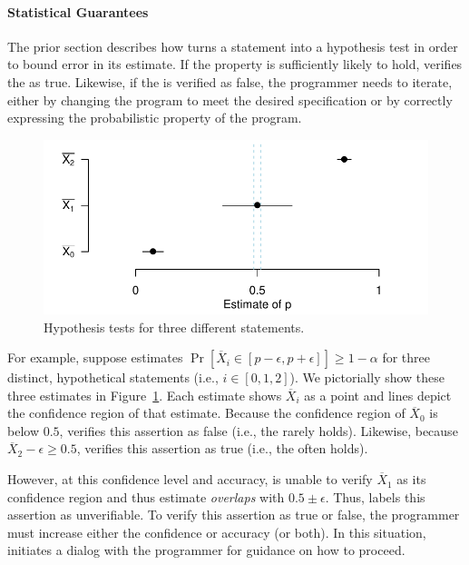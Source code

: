 \paragraph{Statistical Guarantees}

The prior section describes how \tool turns a \passert statement into
a hypothesis test in order to
bound error in its estimate. If the property is sufficiently likely
to hold, \tool verifies the \passert as true.  Likewise, if the \passert is
verified as false,
the programmer needs to iterate, either by changing
the program to meet the desired specification or by correctly expressing the
probabilistic property of the program.

\begin{figure}
    \begin{centering}
    \includegraphics[width=\columnwidth]{figs/verification}
    \end{centering}
    \caption{Hypothesis tests for three different \passert statements.}
    \label{fig:verify}
\end{figure}
For example, suppose \tool estimates $\Pr[\overline{X}_i \in [p - \epsilon,
p + \epsilon]] \ge 1 - \alpha$ for three distinct, hypothetical \passert statements
(i.e., $i \in [0,1,2]$). We pictorially show these three estimates in
Figure~\ref{fig:verify}. Each estimate shows $\overline{X}_i$ as a point
and lines depict the confidence region of that estimate.  
Because the confidence region of $\overline{X}_0$ is below $0.5$, \tool verifies
this assertion as false (i.e., the \passert rarely holds).  
Likewise, because $\overline{X}_2 - \epsilon \ge 0.5$, \tool verifies this
assertion as true (i.e., the \passert often holds).

However, at this confidence level and accuracy, \tool is unable to
verify $\overline{X}_1$ as its confidence region and thus estimate \emph{overlaps} with $0.5 \pm \epsilon$.  Thus, \tool
labels this assertion as unverifiable.  To verify this assertion as
true or false, the programmer must increase either the
confidence or accuracy (or both).  In this situation, \tool initiates
a dialog with the programmer for guidance on how to proceed.
